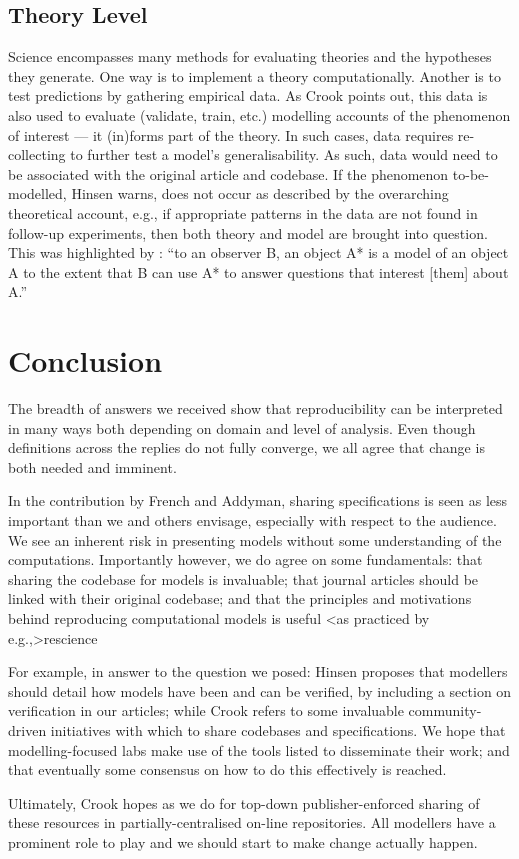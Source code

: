 \documentclass[jou]{apa6}
\begin{document}
\subsection{Theory Level}
Science encompasses many methods for evaluating theories and the hypotheses they generate.
One way is to implement a theory computationally.
Another is to test predictions by gathering empirical data.
As Crook points out, this data is also used to evaluate (validate, train, etc.) modelling accounts of the phenomenon of interest --- it (in)forms part of the theory.
In such cases, data requires re-collecting to further test a model's generalisability.
As such, data would need to be associated with the original article and codebase. 
If the phenomenon to-be-modelled, Hinsen warns, does not occur as described by the overarching theoretical account, e.g., if appropriate patterns in the data are not found in follow-up experiments, then both theory and model are brought into question.
This was highlighted by : ``to an observer B, an object A* is a model of an object A to the extent that B can use A* to answer questions that interest [them] about A.''

\section{Conclusion}
The breadth of answers we received show that reproducibility can be interpreted in many ways both depending on domain and level of analysis.
Even though definitions across the replies do not fully converge, we all agree that change is both needed and imminent.

In the contribution by French and Addyman, sharing specifications is seen as less important than we and others envisage, especially with respect to the audience.
We see an inherent risk in presenting models without some understanding of the computations.
Importantly however, we do agree on some fundamentals: that sharing the codebase for models is invaluable; that journal articles should be linked with their original codebase; and that the principles and motivations behind reproducing computational models  is useful \citeA<as practiced by e.g.,>{rescience}

For example, in answer to the question we posed: Hinsen proposes that modellers should detail how models have been and can be verified, by including a section on verification in our articles; while Crook refers to some invaluable community-driven initiatives with which to share codebases and specifications. 
We hope that modelling-focused labs make use of the tools listed to disseminate their work; and that eventually some consensus on how to do this effectively is reached.

Ultimately, Crook hopes as we do for top-down publisher-enforced sharing of these resources in partially-centralised on-line repositories.
All modellers have a prominent role to play and we should start to make change actually happen.



\hspace*{1cm}
\end{document}

